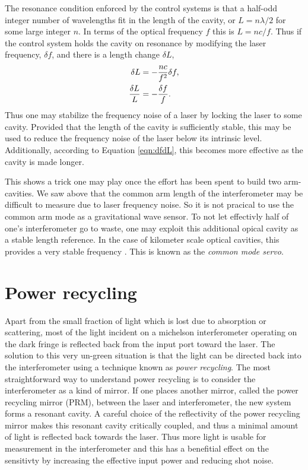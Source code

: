 The resonance condition enforced by the control systems is that a half-odd integer number of wavelengths fit in the length of the cavity, or $L=n\lambda/2$ for some large integer $n$. %
In terms of the optical frequency $f$ this is $L=nc/f$. %
Thus if the control system holds the cavity on resonance by modifying the laser frequency, $\delta f$, and there is a length change $\delta L$,
\begin{align}
\delta L &= -\frac{nc}{f^2}\delta f,\notag \\
\frac{\delta L}{L} &= -\frac{\delta f}{f}.
\label{eqn:dfdL}
\end{align}
Thus one may stabilize the frequency noise of a laser by locking the laser to some cavity. %
Provided that the length of the cavity is sufficiently stable, this may be used to reduce the frequency noise of the laser below its intrinsic level. %
Additionally, according to Equation \ref{eqn:dfdL}, this becomes more effective as the cavity is made longer.

This shows a trick one may play once the effort has been spent to build two arm-cavities. %
We saw above that the common arm length of the interferometer may be difficult to measure due to laser frequency noise. %
So it is not pracical to use the common arm mode as a gravitational wave sensor. %
To not let effectivly half of one's interferometer go to waste, one may exploit this additional opical cavity as a stable length reference. %
In the case of kilometer scale optical cavities, this provides a very stable frequency . %
This is known as the \emph{common mode servo}.

\section{Power recycling}
Apart from the small fraction of light which is lost due to absorption or scattering, most of the light incident on a michelson interferometer operating on the dark fringe is reflected back from the input port toward the laser. %
The solution to this very un-green situation is that the light can be directed back into the interferometer using a technique known as \emph{power recycling}. %
The most straightforward way to understand power recycling is to consider the interferometer as a kind of mirror. %
If one places another mirror, called the power recycling mirror (PRM), between the laser and interferometer, the new system forms a resonant cavity. %
A careful choice of the reflectivity of the power recycling mirror makes this resonant cavity critically coupled, and thus a minimal amount of light is reflected back towards the laser. %
Thus more light is usable for measurement in the interferometer and this has a benefitial effect on the sensitivty by increasing the effective input power and reducing shot noise.


